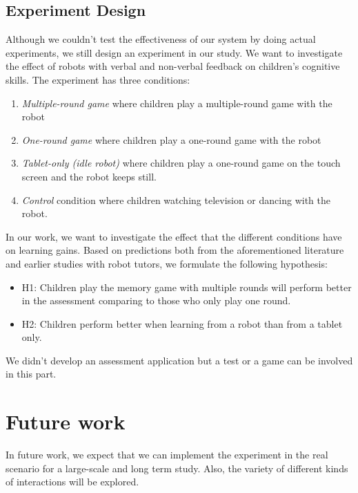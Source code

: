 \documentclass[12pt]{article}
\begin{document}
\subsection{Experiment Design}
Although we couldn't test the effectiveness of our system by doing actual experiments, we still design an experiment in our study. We want to investigate the effect of robots with verbal and non-verbal feedback on children's cognitive skills. The experiment has three conditions:
\begin{enumerate}
\item \textit{Multiple-round game} where children play a multiple-round game with the robot
\item \textit{One-round game} where children play a one-round game with the robot
\item \textit{Tablet-only (idle robot)} where children play a one-round game on the touch screen and the robot keeps still.
\item \textit{Control} condition where children watching television or dancing with the robot.
\end{enumerate}

In our work, we want to investigate the effect that the different conditions have on learning gains. Based on predictions both from the aforementioned literature and earlier studies with robot tutors, we formulate the following hypothesis:
\begin{itemize}
\item H1: Children play the memory game with multiple rounds will perform better in the assessment comparing to those who only play one round.
\item H2: Children perform better when learning from a robot than from a tablet only.
\end{itemize}

We didn't develop an assessment application but a test or a game can be involved in this part.
 
\newpage
\section{Future work}

In future work, we expect that we can implement the experiment in the real scenario for a large-scale and long term study. Also, the variety of different kinds of interactions will be explored.
 
\newpage


 
\end{document}
